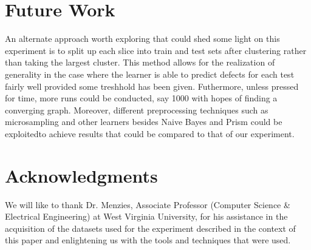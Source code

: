 \documentclass{sig-alternate}
\begin{document}
\section{Future Work}
An alternate approach worth exploring that could shed some light on this experiment is to split up each slice into train and test sets after clustering rather than taking the largest cluster. This method allows for the realization of generality in the case where the learner is able to predict defects for each test fairly well provided some treshhold has been given. Futhermore, unless pressed for time, more runs could be conducted, say 1000 with hopes of finding a converging graph. Moreover, different preprocessing techniques such as microsampling and other learners besides Naive Bayes and Prism could be exploitedto achieve results that could be compared to that of our experiment. 

\section{Acknowledgments}
We will like to thank Dr. Menzies, Associate Professor (Computer Science & Electrical Engineering) at West Virginia University, for his assistance in the acquisition of the datasets used for the experiment described in the context of this paper and enlightening us with the tools and techniques that were used. 

%

%
%
\end{document}
